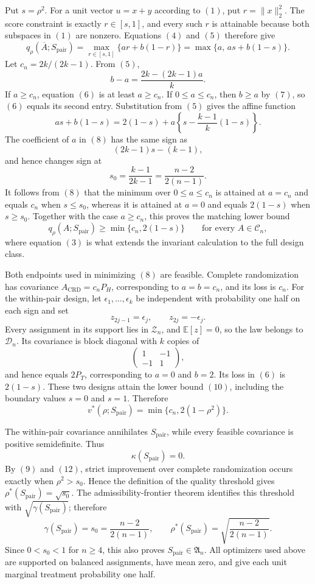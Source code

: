 Put \(s=\rho^2\).  For a unit vector \(u=x+y\) according to \((1)\), put \(r=\|x\|_2^2\).  The score constraint is exactly \(r\in[s,1]\), and every such \(r\) is attainable because both subspaces in \((1)\) are nonzero.  Equations \((4)\) and \((5)\) therefore give
\[
q_\rho(\overline A;S_{\mathrm{pair}})
=\max_{r\in[s,1]}\{ar+b(1-r)\}
=\max\{a,\,as+b(1-s)\}.
\tag{6}
\]
Let \(c_n=2k/(2k-1)\).  From \((5)\),
\[
b-a=\frac{2k-(2k-1)a}{k}.
\tag{7}
\]
If \(a\geq c_n\), equation \((6)\) is at least \(a\geq c_n\).  If \(0\leq a\leq c_n\), then \(b\geq a\) by \((7)\), so \((6)\) equals its second entry.  Substitution from \((5)\) gives the affine function
\[
as+b(1-s)
=2(1-s)+a\left\{s-\frac{k-1}{k}(1-s)\right\}.
\tag{8}
\]
The coefficient of \(a\) in \((8)\) has the same sign as
\[
(2k-1)s-(k-1),
\]
and hence changes sign at
\[
s_0=\frac{k-1}{2k-1}=\frac{n-2}{2(n-1)}.
\tag{9}
\]
It follows from \((8)\) that the minimum over \(0\leq a\leq c_n\) is attained at \(a=c_n\) and equals \(c_n\) when \(s\leq s_0\), whereas it is attained at \(a=0\) and equals \(2(1-s)\) when \(s\geq s_0\).  Together with the case \(a\geq c_n\), this proves the matching lower bound
\[
q_\rho(A;S_{\mathrm{pair}})
\geq\min\{c_n,2(1-s)\}
\qquad\text{for every }A\in\mathcal C_n,
\tag{10}
\]
where equation \((3)\) is what extends the invariant calculation to the full design class.

Both endpoints used in minimizing \((8)\) are feasible.  Complete randomization has covariance \(A_{\mathrm{CRD}}=c_nP_H\), corresponding to \(a=b=c_n\), and its loss is \(c_n\).  For the within-pair design, let \(\epsilon_1,\ldots,\epsilon_k\) be independent with probability one half on each sign and set
\[
z_{2j-1}=\epsilon_j,
\qquad z_{2j}=-\epsilon_j.
\tag{11}
\]
Every assignment in its support lies in \(\mathcal Z_n\), and \(\mathbb E[z]=0\), so the law belongs to \(\mathcal D_n\).  Its covariance is block diagonal with \(k\) copies of
\[
\begin{pmatrix}1&-1\\-1&1\end{pmatrix},
\]
and hence equals \(2P_T\), corresponding to \(a=0\) and \(b=2\).  Its loss in \((6)\) is \(2(1-s)\).  These two designs attain the lower bound \((10)\), including the boundary values \(s=0\) and \(s=1\).  Therefore
\[
v^*(\rho;S_{\mathrm{pair}})
=\min\{c_n,2(1-\rho^2)\}.
\tag{12}
\]

The within-pair covariance annihilates \(S_{\mathrm{pair}}\), while every feasible covariance is positive semidefinite.  Thus
\[
\kappa(S_{\mathrm{pair}})=0.
\tag{13}
\]
By \((9)\) and \((12)\), strict improvement over complete randomization occurs exactly when \(\rho^2>s_0\).  Hence the definition of the quality threshold gives \(\rho^*(S_{\mathrm{pair}})=\sqrt{s_0}\).  The admissibility-frontier theorem identifies this threshold with \(\sqrt{\gamma(S_{\mathrm{pair}})}\); therefore
\[
\gamma(S_{\mathrm{pair}})=s_0=\frac{n-2}{2(n-1)},
\qquad
\rho^*(S_{\mathrm{pair}})=\sqrt{\frac{n-2}{2(n-1)}}.
\]
Since \(0<s_0<1\) for \(n\geq4\), this also proves \(S_{\mathrm{pair}}\in\mathfrak A_n\).  All optimizers used above are supported on balanced assignments, have mean zero, and give each unit marginal treatment probability one half.